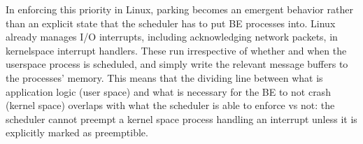 In enforcing this priority in Linux, parking becomes an emergent behavior rather
than an explicit state that the scheduler has to put BE processes into. Linux
already manages I/O interrupts, including acknowledging network packets, in
kernelspace interrupt handlers. These run irrespective of whether and when the
userspace process is scheduled, and simply write the relevant message buffers to
the processes' memory. This means that the dividing line between what is
application logic (user space) and what is necessary for the BE to not crash
(kernel space) overlaps with what the scheduler is able to enforce vs not: the
scheduler cannot preempt a kernel space process handling an interrupt unless it
is explicitly marked as preemptible.
